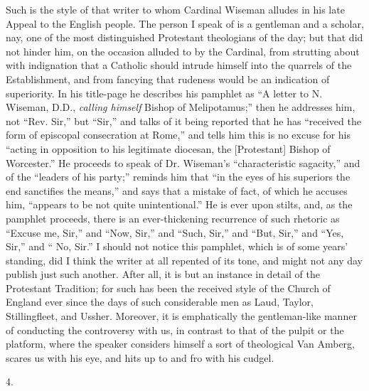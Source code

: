 Such is the style of that writer to whom Cardinal
Wiseman alludes in his late Appeal to the English people.
The person I speak of is a gentleman and a scholar, nay,
one of the most distinguished Protestant theologians of
the day; but that did not hinder him, on the occasion
alluded to by the Cardinal, from strutting about with
indignation that a Catholic should intrude himself into
the quarrels of the Establishment, and from fancying that
rudeness would be an indication of superiority. In his
title-page he describes his pamphlet as ``A letter to
N. Wiseman, D.D., \emph{calling himself} Bishop of
Melipotamus;'' then he addresses him, not ``Rev.
Sir,'' but ``Sir,'' and talks of it being
reported that he has ``received the form of episcopal
consecration at Rome,'' and tells him this is no
excuse for his ``acting in opposition to his
legitimate diocesan, the [Protestant] Bishop of
Worcester.'' He proceeds to speak of Dr. Wiseman's
``characteristic sagacity,'' and of the
``leaders of his party;'' reminds him that
``in the eyes of his superiors the end sanctifies the
means,'' and says that a mistake of fact, of which he
accuses him, ``appears to be not quite
unintentional.'' He is ever upon stilts, and, as the
pamphlet proceeds, there is an ever-thickening recurrence
of such rhetoric as ``Excuse me, Sir,'' and
``Now, Sir,'' and ``Such, Sir,'' and
``But, Sir,'' and ``Yes, Sir,'' and
`` No, Sir.'' I should not notice this pamphlet,
which is of some years' standing, did I think the writer
at all repented of its tone, and might not any day
publish just such another. After all, it is but an
instance in detail of the Protestant Tradition; for such
has been the received style of the Church of England ever
since the days of such considerable men as Laud, Taylor,
Stillingfleet, and Ussher. Moreover, it is emphatically
the gentleman-like manner of conducting the controversy
with us, in contrast to that of the pulpit or the
platform, where the speaker considers himself a sort of
theological Van Amberg, scares us with his eye, and hits
up to and fro with his cudgel.

4.

